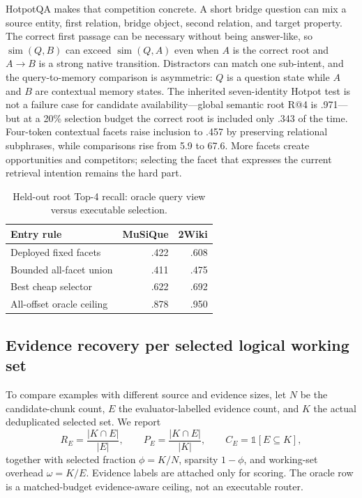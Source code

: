 HotpotQA makes that competition concrete.  A short bridge question can mix a source entity, first
relation, bridge object, second relation, and target property.  The correct first passage can be
necessary without being answer-like, so $\operatorname{sim}(Q,B)$ can exceed
$\operatorname{sim}(Q,A)$ even when $A$ is the correct root and $A\rightarrow B$ is a strong native
transition.  Distractors can match one sub-intent, and the query-to-memory comparison is asymmetric:
$Q$ is a question state while $A$ and $B$ are contextual memory states.  The inherited seven-identity
Hotpot test is not a failure case for candidate availability---global semantic root R@4 is .971---but
at a 20\% selection budget the correct root is included only .343 of the time.  Four-token contextual
facets raise inclusion to .457 by preserving relational subphrases, while comparisons rise from 5.9
to 67.6.  More facets create opportunities and competitors; selecting the facet that expresses the
current retrieval intention remains the hard part.

\begin{table}[H]
\centering
\caption{Held-out root Top-4 recall: oracle query view versus executable selection.}
\label{tab:main-entry}
\small
\begin{tabular}{lrr}
\toprule
Entry rule & MuSiQue & 2Wiki \\
\midrule
Deployed fixed facets & .422 & .608 \\
Bounded all-facet union & .411 & .475 \\
Best cheap selector & .622 & .692 \\
All-offset oracle ceiling & .878 & .950 \\
\bottomrule
\end{tabular}
\end{table}

\subsection{Evidence recovery per selected logical working set}

To compare examples with different source and evidence sizes, let $N$ be the
candidate-chunk count, $E$ the evaluator-labelled evidence count, and $K$ the
actual deduplicated selected set.  We report
\[
R_E=\frac{|K\cap E|}{|E|},\qquad
P_E=\frac{|K\cap E|}{|K|},\qquad
C_E=\mathbb{1}[E\subseteq K],
\]
together with selected fraction $\phi=K/N$, sparsity $1-\phi$, and working-set
overhead $\omega=K/E$.  Evidence labels are attached only for scoring.  The
oracle row is a matched-budget evidence-aware ceiling, not an executable router.

